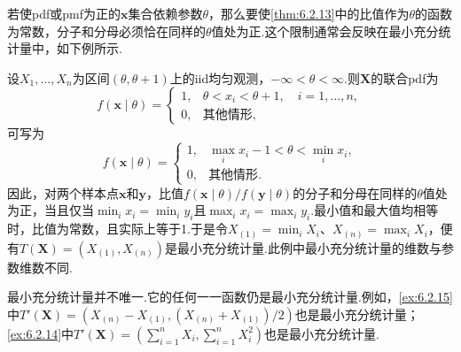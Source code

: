 若使pdf或pmf为正的$\boldsymbol x$集合依赖参数$\theta$，那么要使\autoref{thm:6.2.13}中的比值作为$\theta$的函数为常数，分子和分母必须恰在同样的$\theta$值处为正.这个限制通常会反映在最小充分统计量中，如下例所示.
\begin{example}[均匀分布的最小充分统计量]\label{ex:6.2.15}
设$X_1,\ldots,X_n$为区间$(\theta,\theta+1)$上的iid均匀观测，$-\infty<\theta<\infty$.则$\boldsymbol X$的联合pdf为
$$f(\boldsymbol x\mid\theta)=\begin{cases}1,&\theta<x_i<\theta+1,\quad i=1,\ldots,n,\\0,&\text{其他情形},\end{cases}$$
可写为
$$f(\boldsymbol x\mid\theta)=\begin{cases}1,&\max_i x_i-1<\theta<\min_i x_i,\\0,&\text{其他情形}.\end{cases}$$
因此，对两个样本点$\boldsymbol x$和$\boldsymbol y$，比值$f(\boldsymbol x\mid\theta)/f(\boldsymbol y\mid\theta)$的分子和分母在同样的$\theta$值处为正，当且仅当$\min_i x_i=\min_i y_i$且$\max_i x_i=\max_i y_i$.最小值和最大值均相等时，比值为常数，且实际上等于1.于是令$X_{(1)}=\min_iX_i$、$X_{(n)}=\max_iX_i$，便有$T(\boldsymbol X)=(X_{(1)},X_{(n)})$是最小充分统计量.此例中最小充分统计量的维数与参数维数不同.
\end{example}
最小充分统计量并不唯一.它的任何一一函数仍是最小充分统计量.例如，\autoref{ex:6.2.15}中$T'(\boldsymbol X)=(X_{(n)}-X_{(1)},(X_{(n)}+X_{(1)})/2)$也是最小充分统计量；\autoref{ex:6.2.14}中$T'(\boldsymbol X)=(\sum_{i=1}^nX_i,\sum_{i=1}^nX_i^2)$也是最小充分统计量.
